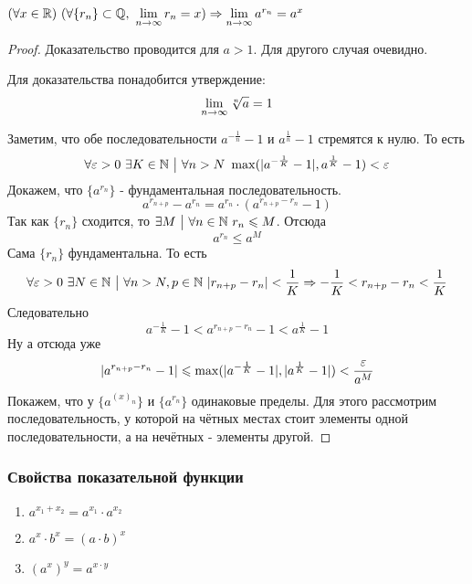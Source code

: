 \begin{lemma}
	$(\forall x \in \mathbb{R})\ (\forall \{r_n\} \subset \mathbb{Q},\ \lim\limits_{n \to \infty} r_n = x) \Rightarrow \lim\limits_{n \to \infty} a^{r_n} = a^x$
\end{lemma}

\begin{proof}
	Доказательство проводится для $a > 1$. Для другого случая очевидно.
	
	Для доказательства понадобится утверждение:
	$$
		\lim\limits_{n \to \infty} \sqrt[n]{a} = 1
	$$
	
	Заметим, что обе последовательности $a^{-\frac{1}{n}} - 1$ и $a^{\frac{1}{n}} - 1$ стремятся к нулю. То есть
	$$
		\forall \varepsilon > 0\ \exists K \in \mathbb{N} \ \big|\  \forall n > N\ \max(|a^{-\frac{1}{K}} - 1|, a^{\frac{1}{K}} - 1) < \varepsilon
	$$
	Докажем, что $\{a^{r_n}\}$ - фундаментальная последовательность.
	$$
		a^{r_{n + p}} - a^{r_n} = a^{r_n} \cdot (a^{r_{n + p} - r_n} - 1)
	$$
	Так как $\{r_n\}$ сходится, то $\exists M \ \big|\  \forall n \in \mathbb{N}\ r_n \leqslant M$. Отсюда
	$$
		a^{r_n} \le a^M
	$$
	Сама $\{r_n\}$ фундаментальна. То есть
	$$
		\forall \varepsilon > 0\ \exists N \in \mathbb{N} \ \big|\  \forall n > N, p \in \mathbb{N}\ |r_{n + p} - r_n| < \frac{1}{K} \Rightarrow -\frac{1}{K} < r_{n + p} - r_n < \frac{1}{K}
	$$
	Следовательно
	$$
		a^{-\frac{1}{K}} - 1 < a^{r_{n + p} - r_n} - 1 < a^{\frac{1}{K}} - 1
	$$
	Ну а отсюда уже
	$$
		|a^{r_{n + p} - r_n} - 1| \leqslant \max(|a^{-\frac{1}{K}} - 1|, |a^{\frac{1}{K}} - 1|) < \frac{\varepsilon}{a^M}
	$$
	Покажем, что у $\{a^{(x)_n}\}$ и $\{a^{r_n}\}$ одинаковые пределы. Для этого рассмотрим последовательность, у которой на чётных местах стоит элементы одной последовательности, а на нечётных - элементы другой.
\end{proof}

\subsubsection*{Свойства показательной функции}

\begin{enumerate}
	\item $a^{x_1 + x_2} = a^{x_1} \cdot a^{x_2}$
	\item $a^x \cdot b^x = (a \cdot b)^x$
	\item $(a^x)^y = a^{x \cdot y}$
\end{enumerate}


